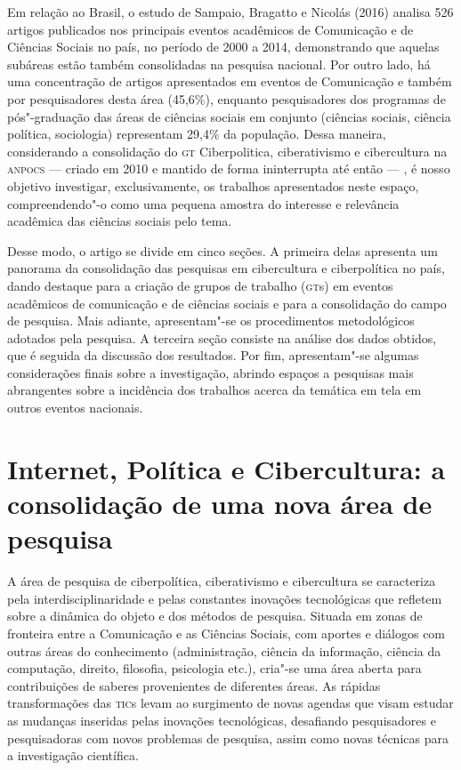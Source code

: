 {Em relação ao Brasil, o estudo de Sampaio, Bragatto e Nicolás (2016)
analisa 526 artigos publicados nos principais eventos acadêmicos de
Comunicação e de Ciências Sociais no país, no período de 2000 a 2014,
demonstrando que aquelas subáreas estão também consolidadas na pesquisa
nacional. Por outro lado, há uma concentração de artigos apresentados em
eventos de Comunicação e também por pesquisadores desta área
(45,6\%), enquanto pesquisadores dos programas de pós"-graduação das
áreas de ciências sociais em conjunto (ciências sociais, ciência
política, sociologia) representam 29,4\% da população. Dessa maneira,
considerando a consolidação do \textsc{gt} Ciberpolitica, ciberativismo e
cibercultura na \textsc{anpocs} --- criado em 2010 e mantido de forma ininterrupta
até então --- , é nosso objetivo investigar, exclusivamente, os trabalhos
apresentados neste espaço, compreendendo"-o como uma pequena amostra do
interesse e relevância acadêmica das ciências sociais pelo tema.

Desse modo, o artigo se divide em cinco seções. A primeira delas
apresenta um panorama da consolidação das pesquisas em cibercultura e
ciberpolítica no país, dando destaque para a criação de grupos de
trabalho (\textsc{gt}s) em eventos acadêmicos de comunicação e de ciências
sociais e para a consolidação do campo de pesquisa. Mais adiante,
apresentam"-se os procedimentos metodológicos adotados pela pesquisa. A
terceira seção consiste na análise dos dados obtidos, que é seguida da
discussão dos resultados. Por fim, apresentam"-se algumas considerações
finais sobre a investigação, abrindo espaços a pesquisas mais
abrangentes sobre a incidência dos trabalhos acerca da temática em tela
em outros eventos nacionais.

\section{Internet, Política e Cibercultura: a consolidação de uma nova área de pesquisa}

A área de pesquisa de ciberpolítica, ciberativismo e cibercultura se
caracteriza pela interdisciplinaridade e pelas constantes inovações
tecnológicas que refletem sobre a dinâmica do objeto e dos métodos de
pesquisa. Situada em zonas de fronteira entre a Comunicação e as
Ciências Sociais, com aportes e diálogos com outras áreas do
conhecimento (administração, ciência da informação, ciência da
computação, direito, filosofia, psicologia etc.), cria"-se uma área
aberta para contribuições de saberes provenientes de diferentes áreas.
As rápidas transformações das \textsc{tic}s levam ao surgimento de novas agendas
que visam estudar as mudanças inseridas pelas inovações tecnológicas,
desafiando pesquisadores e pesquisadoras com novos problemas de
pesquisa, assim como novas técnicas para a investigação científica.

}

